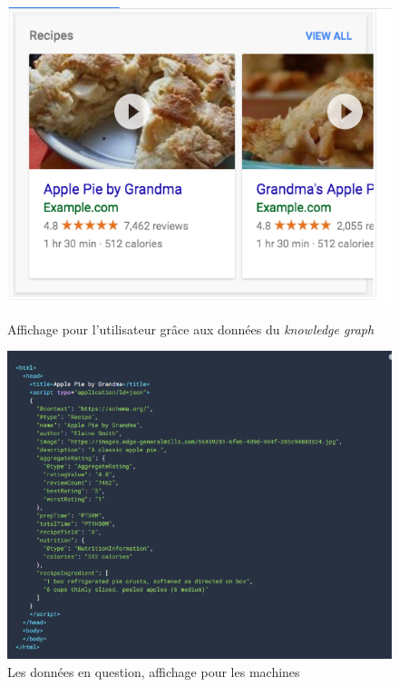 \begin{figure}[h!]
	\centering
	\begin{minipage}[b]{0.45\textwidth}
		\centering
		\includegraphics[width=\textwidth]{images/image4.png}
		\caption{Affichage pour l'utilisateur grâce aux données du \textit{knowledge graph}}
		\label{fig:image4}
	\end{minipage}
	\hspace{0.05\textwidth} %
	\begin{minipage}[b]{0.45\textwidth}
		\centering
		\includegraphics[width=\textwidth]{images/image5.png}
		\caption{Les données en question, affichage pour les machines}
		\label{fig:image5}
	\end{minipage}
\end{figure}
